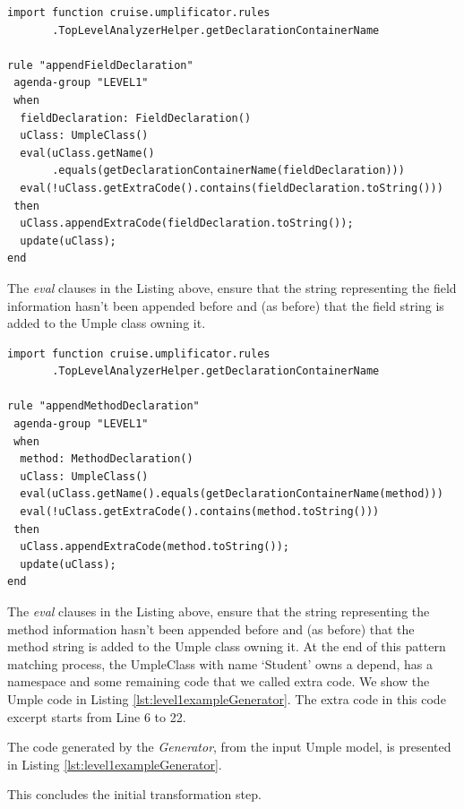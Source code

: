 \begin{lstlisting}[language={drools},label={lst:appendField}, caption=Rule appendFieldDeclaration]
import function cruise.umplificator.rules
       .TopLevelAnalyzerHelper.getDeclarationContainerName
       
rule "appendFieldDeclaration"
 agenda-group "LEVEL1" 
 when
  fieldDeclaration: FieldDeclaration()
  uClass: UmpleClass()
  eval(uClass.getName()
       .equals(getDeclarationContainerName(fieldDeclaration)))
  eval(!uClass.getExtraCode().contains(fieldDeclaration.toString()))
 then
  uClass.appendExtraCode(fieldDeclaration.toString());
  update(uClass);
end
\end{lstlisting}

The \textit{eval} clauses in the Listing above, ensure that the string representing the field information hasn't been appended before and (as before) that the field string is added to the Umple class owning it.


\begin{lstlisting}[language={drools},label={lst:appendMethod}, caption=Rule appendMethodDeclaration]
import function cruise.umplificator.rules
       .TopLevelAnalyzerHelper.getDeclarationContainerName
       
rule "appendMethodDeclaration"
 agenda-group "LEVEL1" 
 when
  method: MethodDeclaration()
  uClass: UmpleClass()
  eval(uClass.getName().equals(getDeclarationContainerName(method)))
  eval(!uClass.getExtraCode().contains(method.toString()))
 then
  uClass.appendExtraCode(method.toString());
  update(uClass);
end
\end{lstlisting}

The \textit{eval} clauses in the Listing above, ensure that the string representing the method information hasn't been appended before and (as before) that the method string is added to the Umple class owning it. 
At the end of this pattern matching process, the UmpleClass with name `Student' owns a depend, has a namespace and some remaining code that we called extra code. We show the Umple code in Listing \ref{lst:level1exampleGenerator}. The extra code in this code excerpt starts from Line 6 to 22.

The code generated by the \textit{Generator}, from the input Umple model, is presented in Listing \ref{lst:level1exampleGenerator}. 

This concludes the initial transformation step.

